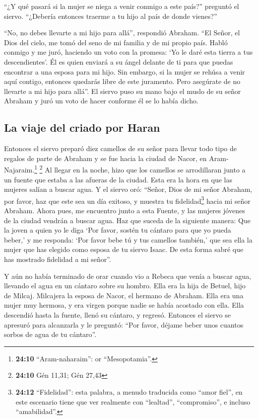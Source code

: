  ``¿Y qué pasará si la mujer se niega a venir conmigo a
este país?'' preguntó el siervo. ``¿Debería entonces traerme a tu hijo
al país de donde vienes?''

 ``No, no debes llevarte a mi hijo para allá'', respondió
Abraham.  ``El Señor, el Dios del cielo, me tomó del seno
de mi familia y de mi propio país. Habló conmigo y me juró, haciendo un
voto con la promesa: `Yo le daré esta tierra a tus descendientes'. Él es
quien enviará a su ángel delante de ti para que puedas encontrar a una
esposa para mi hijo.  Sin embargo, si la mujer se rehúsa a
venir aquí contigo, entonces quedarás libre de este juramento. Pero
asegúrate de no llevarte a mi hijo para allá''.  El siervo
puso su mano bajo el muslo de su señor Abraham y juró un voto de hacer
conforme él se lo había dicho.

\hypertarget{la-viaje-del-criado-por-haran}{%
\subsection{La viaje del criado por
Haran}\label{la-viaje-del-criado-por-haran}}

 Entonces el siervo preparó diez camellos de su señor
para llevar todo tipo de regalos de parte de Abraham y se fue hacia la
ciudad de Nacor, en Aram-Najaraim.\footnote{\textbf{24:10}
  ``Aram-naharaim'': or ``Mesopotamia''.} \footnote{\textbf{24:10} Gén
  11,31; Gén 27,43}  Al llegar en la noche, hizo que los
camellos se arrodillaran junto a un fuente que estaba a las afueras de
la ciudad. Esta era la hora en que las mujeres salían a buscar agua.
 Y el siervo oró: ``Señor, Dios de mi señor Abraham, por
favor, haz que este sea un día exitoso, y muestra tu
fidelidad\footnote{\textbf{24:12} ``Fidelidad'': esta palabra, a menudo
  traducida como ``amor fiel'', en este escenario tiene que ver
  realmente con ``lealtad'', ``compromiso'', e incluso ``amabilidad''.}
hacia mi señor Abraham.  Ahora pues, me encuentro junto a
esta Fuente, y las mujeres jóvenes de la ciudad vendrán a buscar agua.
 Haz que suceda de la siguiente manera: Que la joven a
quien yo le diga `Por favor, sostén tu cántaro para que yo pueda beber,'
y me responda: `Por favor bebe tú y tus camellos también,' que sea ella
la mujer que has elegido como esposa de tu siervo Isaac. De esta forma
sabré que has mostrado fidelidad a mi señor''.

 Y aún no había terminado de orar cuando vio a Rebeca que
venía a buscar agua, llevando el agua en un cántaro sobre su hombro.
Ella era la hija de Betuel, hijo de Milcaj. Milcajera la esposa de
Nacor, el hermano de Abraham.  Ella era una mujer muy
hermosa, y era virgen porque nadie se había acostado con ella. Ella
descendió hasta la fuente, llenó su cántaro, y regresó. 
Entonces el siervo se apresuró para alcanzarla y le preguntó: ``Por
favor, déjame beber unos cuantos sorbos de agua de tu cántaro''.

